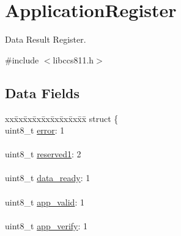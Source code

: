 \hypertarget{union_application_register}{}\section{Application\+Register}
\label{union_application_register}


Data Result Register.  




{\ttfamily \#include $<$libccs811.\+h$>$}

\subsection*{Data Fields}
\begin{DoxyCompactItemize}
\item 
\begin{tabbing}
xx\=xx\=xx\=xx\=xx\=xx\=xx\=xx\=xx\=\kill
struct \{\\
\>uint8\_t \mbox{\hyperlink{union_application_register_adc64ccb7538429fe78e3fe0139267370}{error}}: 1\\
\>\\
\>uint8\_t \mbox{\hyperlink{union_application_register_a2a2556147677ece60b8aadf4a0d608ed}{reserved1}}: 2\\
\>\\
\>uint8\_t \mbox{\hyperlink{union_application_register_a7b89ba3779ca235c32a469e89de8da46}{data\_ready}}: 1\\
\>\\
\>uint8\_t \mbox{\hyperlink{union_application_register_ad622f34a9f1cc0e8cf002492f2fe8e8a}{app\_valid}}: 1\\
\>\\
\>uint8\_t \mbox{\hyperlink{union_application_register_adce608653e619b089b54d75eed8bf6ed}{app\_verify}}: 1\\
\>
\end{tabbing}
\end{DoxyCompactItemize}

